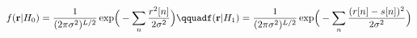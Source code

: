 \documentclass[preview]{standalone}
\begin{document}
\begin{align*}
\special{dvisvgm:raw <g id='unique000'>}f(\mathbf r|H_0)=\frac{1}{(2\pi\sigma^2)^{L/2}}\exp\!\Big(-\sum_n \frac{r^2[n]}{2\sigma^2}\Big)\qquadf(\mathbf r|H_1)=\frac{1}{(2\pi\sigma^2)^{L/2}}\exp\!\Big(-\sum_n \frac{(r[n]-s[n])^2}{2\sigma^2}\Big)\special{dvisvgm:raw </g>}
\end{align*}
\end{document}
